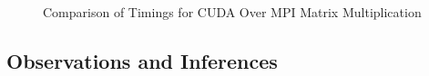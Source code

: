 \documentclass[10pt]{article}
\begin{document}
\begin{figure}[p]
\centering
     
        
    \caption{Comparison of Timings for CUDA Over MPI Matrix Multiplication}
   \label{cudamatrix}
\end{figure}


\subsection{Observations and Inferences}
\end{document}
